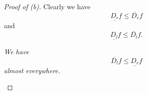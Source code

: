\documentclass[pmath451]{subfiles}
\begin{document}
    \begin{proof}[Proof of (b)]\qedplacedtrue
        Clearly we have
        \begin{equation*}
            \underline{D_r}f \leq \overline{D_r}f
        \end{equation*}
        and
        \begin{equation*}
            \underline{D_l}f \leq \overline{D_l}f.
        \end{equation*}

        \begin{claim}
            \textit{We have
                \begin{equation*}
                    \overline{D_l}f \leq \underline{D_r}f
                \end{equation*}
                almost everywhere.
            }


\end{claim}
\end{proof}
\end{document}
